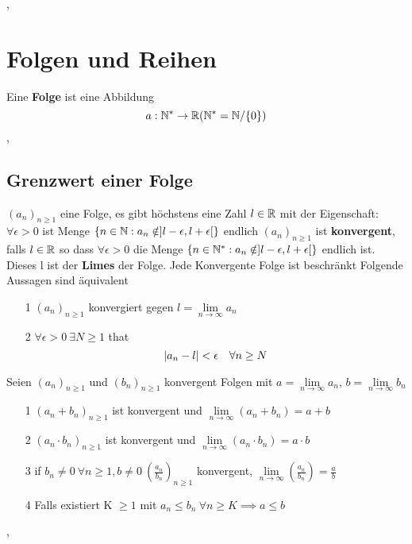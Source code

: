 \sep
\section{Folgen und Reihen}
\Def[2.1] Eine \textbf{Folge} ist eine Abbildung 
\[a: \mathbb{N}^* \rightarrow \mathbb{R} (\mathbb{N}^* = \mathbb{N} / \{0\})\]
\sep
\subsection{Grenzwert einer Folge}
\Lemma[2.3]\((a_n)_{n\geq1}\) eine Folge, es gibt höchstens eine Zahl \(l \in \mathbb{R}\) mit der Eigenschaft: \newline
\(\forall \epsilon > 0\) ist Menge \(\{n \in \mathbb{N} : a_n \notin ]l-\epsilon, l+\epsilon [\}\) endlich \newline
\Def[2.4] \((a_n)_{n\geq1}\) ist \textbf{konvergent}, falls \(l \in \mathbb{R}\) so dass \(\forall \epsilon > 0\)
die Menge \(\{n \in \mathbb{N}^* : a_n \notin ]l-\epsilon, l+\epsilon [\}\) endlich ist. Dieses l ist der \textbf{Limes} der Folge. \newline
\Bem[2.5] Jede Konvergente Folge ist beschränkt
\Lemma[2.6] Folgende Aussagen sind äquivalent
\begin{enumerate}
    \item [1]  \((a_n)_{n\geq1}\) konvergiert gegen \(l = \lim\limits_{n \rightarrow \infty} a_n\)
    \item [2] \(\forall \epsilon > 0 \ \exists N \geq 1\) that
    \[ \left\lvert a_n - l \right\rvert < \epsilon \quad \forall n \geq N \]
\end{enumerate}
\Satz[2.8] Seien \((a_n)_{n \geq 1}\) und \((b_n)_{n \geq 1}\) konvergent Folgen mit \(a= \lim\limits_{n \rightarrow \infty} a_n\), $b = \lim\limits_{n \rightarrow \infty} b_n$
\begin{enumerate} 
    \item [1] \((a_n + b_n)_{n \geq 1}\) ist konvergent und \newline \(\lim\limits_{n \rightarrow \infty} (a_n + b_n) = a+b\)
    \item [2] \((a_n \cdot b_n)_{n \geq 1}\) ist konvergent und \newline \(\lim\limits_{n \rightarrow \infty} (a_n \cdot b_n) = a \cdot b\)
    \item [3] if \(b_n \neq 0 \ \forall n \geq 1, b \neq 0 \ (\frac{a_n}{b_n})_{n\geq 1}\) konvergent, \(\lim\limits_{n \rightarrow \infty} (\frac{a_n}{b_n}) = \frac{a}{b}\)
    \item [4] Falls existiert K \(\geq 1\) mit \(a_n \leq b_n \ \forall n \geq K \implies a \leq b\)
\end{enumerate}
\sep

